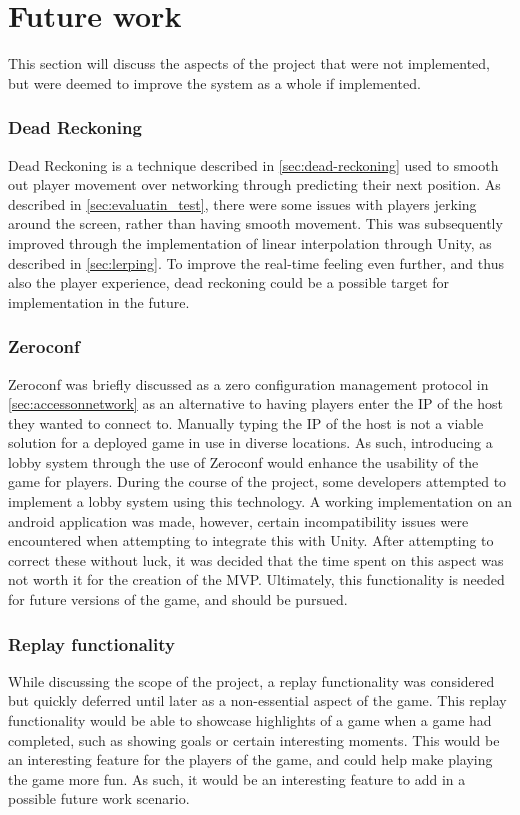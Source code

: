 \section{Future work}
This section will discuss the aspects of the project that were not implemented, but were deemed to improve the system as a whole if implemented.

\subsubsection{Dead Reckoning}
Dead Reckoning is a technique described in \autoref{sec:dead-reckoning} used to smooth out player movement over networking through predicting their next position.
As described in \autoref{sec:evaluatin_test}, there were some issues with players jerking around the screen, rather than having smooth movement.
This was subsequently improved through the implementation of linear interpolation through Unity, as described in \autoref{sec:lerping}.
To improve the real-time feeling even further, and thus also the player experience, dead reckoning could be a possible target for implementation in the future.

\subsubsection{Zeroconf}
Zeroconf was briefly discussed as a zero configuration management protocol in \autoref{sec:accessonnetwork} as an alternative to having players enter the IP of the host they wanted to connect to.
Manually typing the IP of the host is not a viable solution for a deployed game in use in diverse locations.
As such, introducing a lobby system through the use of Zeroconf would enhance the usability of the game for players.
During the course of the project, some developers attempted to implement a lobby system using this technology.
A working implementation on an android application was made, however, certain incompatibility issues were encountered when attempting to integrate this with Unity.
After attempting to correct these without luck, it was decided that the time spent on this aspect was not worth it for the creation of the MVP.
Ultimately, this functionality is needed for future versions of the game, and should be pursued.

\subsubsection{Replay functionality}
While discussing the scope of the project, a replay functionality was considered but quickly deferred until later as a non-essential aspect of the game.
This replay functionality would be able to showcase highlights of a game when a game had completed, such as showing goals or certain interesting moments.
This would be an interesting feature for the players of the game, and could help make playing the game more fun.
As such, it would be an interesting feature to add in a possible future work scenario.

